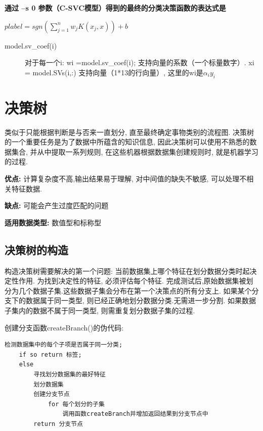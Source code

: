 \documentclass[12pt]{article}
\numberwithin{equation}{section}%
\begin{document}
\textbf{通过 –s 0 参数（C-SVC模型）得到的最终的分类决策函数的表达式是}

$plabel = sgn(\sum_{j=1}^{n}w_{j}K(x_{j}, x)) + b  $


\begin{description}

\item[model.sv\_coef(i)] 对于每一个i: wi =model.sv\_coef(i); 支持向量的系数（一个标量数字）. xi = model.SVs(i,:) 支持向量（1*13的行向量）, 这里的wi是$\alpha_{i}y_{i}$
\end{description}






\section{决策树}

类似于只能根据判断是与否来一直划分, 直至最终确定事物类别的流程图. 决策树的一个重要任务是为了数据中所蕴含的知识信息, 因此决策树可以使用不熟悉的数据集合, 并从中提取一系列规则, 在这些机器根据数据集创建规则时, 就是机器学习的过程. 

\textbf{优点: }计算复杂度不高,输出结果易于理解, 对中间值的缺失不敏感, 可以处理不相关特征数据.

\textbf{缺点: }可能会产生过度匹配的问题

\textbf{适用数据类型: }数值型和标称型

\subsection{决策树的构造}

构造决策树需要解决的第一个问题: 当前数据集上哪个特征在划分数据分类时起决定性作用. 为找到决定性的特征, 必须评估每个特征. 完成测试后,原始数据集被划分为几个数据子集.这些数据子集会分布在第一个决策点的所有分支上. 如果某个分支下的数据属于同一类型, 则已经正确地划分数据分类.无需进一步分割. 如果数据子集内的数据不属于同一类型, 则需重复划分数据子集的过程. 

创建分支函数createBranch()的伪代码:

\begin{lstlisting}
检测数据集中的每个子项是否属于同一分类;
	if so return 标签;
	else
		寻找划分数据集的最好特征
		划分数据集
		创建分支节点
			for 每个划分的子集
				调用函数createBranch并增加返回结果到分支节点中
		return 分支节点
\end{lstlisting}
\end{document}
